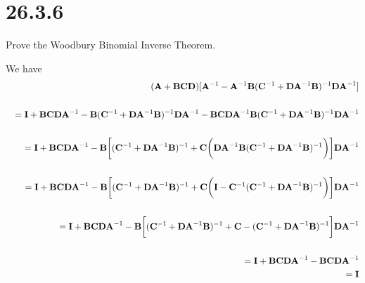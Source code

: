 \section*{26.3.6}
Prove the Woodbury Binomial Inverse Theorem.

\bigskip
\noindent
We have
\begin{eqnarray*}
&&({\bf A}+{\bf BCD})[{\bf A}^{-1}-{\bf A}^{-1}{\bf B}({\bf C}^{-1}+{\bf D}{\bf A}^{-1}{\bf B})^{-1}{\bf DA}^{-1}]\\
\\
&&={\bf I}+{\bf BCDA}^{-1}
-{\bf B}({\bf C}^{-1}+{\bf D}{\bf A}^{-1}{\bf B})^{-1}{\bf DA}^{-1}
-{\bf BCDA}^{-1}{\bf B}({\bf C}^{-1}+{\bf D}{\bf A}^{-1}{\bf B})^{-1}{\bf DA}^{-1}\\
\\
&&={\bf I}+{\bf BCDA}^{-1}-{\bf B}\bigg[({\bf C}^{-1}+{\bf DA}^{-1}{\bf B})^{-1}+{\bf C}\bigg({\bf DA}^{-1}{\bf B}({\bf C}^{-1}+{\bf DA}^{-1}{\bf B})^{-1}\bigg)\bigg]{\bf DA}^{-1}\\
\\
&&={\bf I}+{\bf BCDA}^{-1}-{\bf B}\bigg[({\bf C}^{-1}+{\bf DA}^{-1}{\bf B})^{-1}
+{\bf C}\bigg({\bf I}-{\bf C}^{-1}({\bf C}^{-1}+{\bf DA}^{-1}{\bf B})^{-1}\bigg)\bigg]{\bf DA}^{-1}\\
\\
&&={\bf I}+{\bf BCDA}^{-1}-{\bf B}\bigg[({\bf C}^{-1}+{\bf DA}^{-1}{\bf B})^{-1}+{\bf C}-({\bf C}^{-1}+{\bf DA}^{-1}{\bf B})^{-1}\bigg]{\bf DA}^{-1}\\
\\
&&={\bf I}+{\bf BCDA}^{-1}-{\bf BCDA}^{-1}\\
&&={\bf I}
\end{eqnarray*}
